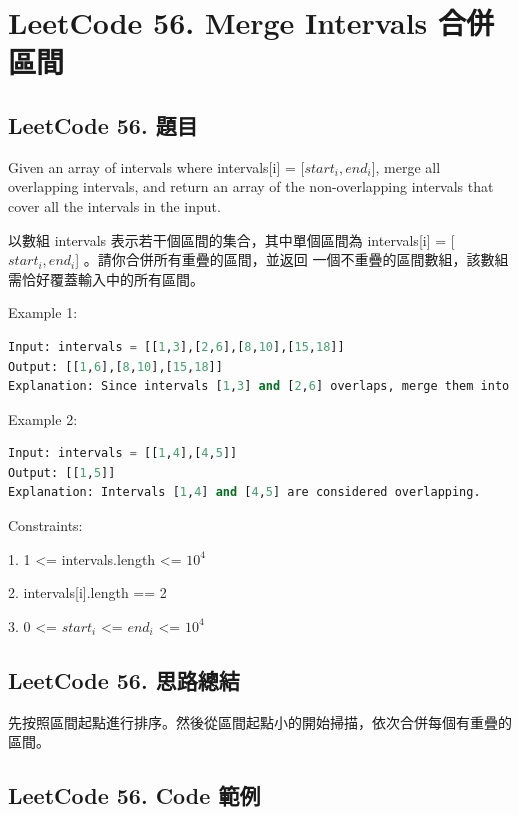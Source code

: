 \documentclass[10pt,UTF8]{ctexart}
\begin{document}
\newpage

\section{LeetCode 56. Merge Intervals 合併區間}

\subsection{LeetCode 56. 題目}

Given an array of intervals where intervals[i] = [$start_{i}, end_{i}$], merge all overlapping intervals, and return an array of the non-overlapping intervals that cover all the intervals in the input.

以數組 intervals 表示若干個區間的集合，其中單個區間為 intervals[i] = [$start_{i}, end_{i}$] 。請你合併所有重疊的區間，並返回 一個不重疊的區間數組，該數組需恰好覆蓋輸入中的所有區間。

Example 1:

\begin{lstlisting}[language={python}]
Input: intervals = [[1,3],[2,6],[8,10],[15,18]]
Output: [[1,6],[8,10],[15,18]]
Explanation: Since intervals [1,3] and [2,6] overlaps, merge them into [1,6].
\end{lstlisting}

Example 2:

\begin{lstlisting}[language={python}]
Input: intervals = [[1,4],[4,5]]
Output: [[1,5]]
Explanation: Intervals [1,4] and [4,5] are considered overlapping.
\end{lstlisting}

Constraints:

1. 1 <= intervals.length <= $10^4$

2. intervals[i].length == 2

3. 0 <= $start_{i}$ <= $end_{i}$ <= $10^4$

\subsection{LeetCode 56. 思路總結}

先按照區間起點進行排序。然後從區間起點小的開始掃描，依次合併每個有重疊的區間。

\subsection{LeetCode 56. Code 範例}
\end{document}
